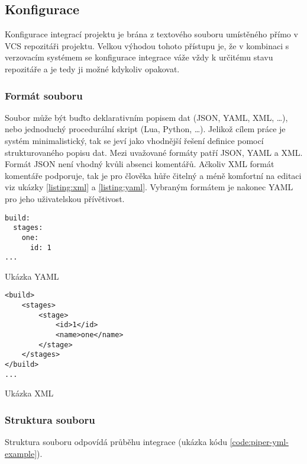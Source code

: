 \subsection{Konfigurace}

Konfigurace integrací projektu je brána z textového souboru umístěného přímo v VCS repozitáři projektu.
Velkou výhodou tohoto přístupu je, že v kombinaci s verzovacím systémem se konfigurace integrace váže vždy k určitému stavu repozitáře a je tedy ji možné kdykoliv opakovat.

\subsubsection{Formát souboru}

Soubor může být buďto deklarativním popisem dat (JSON, YAML, XML, \ldots), nebo jednoduchý procedurální skript (Lua, Python, \ldots).
Jelikož cílem práce je systém minimalistický, tak se jeví jako vhodnější řešení definice pomocí strukturovaného popisu dat.
Mezi uvažované formáty patří JSON, YAML a XML.
Formát JSON není vhodný kvůli absenci komentářů.
Ačkoliv XML formát komentáře podporuje, tak je pro člověka hůře čitelný a méně komfortní na editaci viz ukázky \ref{listing:xml} a \ref{listing:yaml}.
Vybraným formátem je nakonec YAML pro jeho uživatelskou přívětivost.

\begin{listing}[ht]
\begin{verbatim}
build:
  stages:
    one:
      id: 1
...
\end{verbatim}
\caption{Ukázka YAML}
\label{listing:yaml}
\end{listing}

\begin{listing}[ht]
\begin{verbatim}
<build>
    <stages>
        <stage>
            <id>1</id>
            <name>one</name>
        </stage>
    </stages>
</build>
...
\end{verbatim}
\caption{Ukázka XML}
\label{listing:xml}
\end{listing}

\subsubsection{Struktura souboru}

Struktura souboru odpovídá průběhu integrace (ukázka kódu \ref{code:piper-yml-example}).

